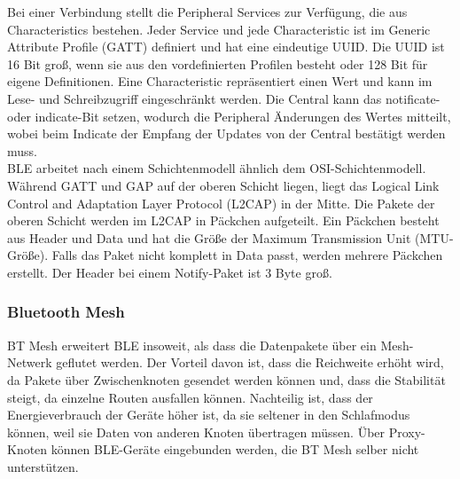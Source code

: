 Bei einer Verbindung stellt die Peripheral Services zur Verfügung, die aus Characteristics bestehen.
Jeder Service und jede Characteristic ist im Generic Attribute Profile (GATT) definiert und hat eine eindeutige UUID.
Die UUID ist 16 Bit groß, wenn sie aus den vordefinierten Profilen besteht oder 128 Bit für eigene Definitionen.
Eine Characteristic repräsentiert einen Wert und kann im Lese- und Schreibzugriff eingeschränkt werden.
Die Central kann das notificate- oder indicate-Bit setzen, wodurch die Peripheral Änderungen des Wertes mitteilt, wobei beim Indicate der Empfang der Updates von der Central bestätigt werden muss. \cite{site_norChara}\\
BLE arbeitet nach einem Schichtenmodell ähnlich dem OSI-Schichtenmodell.
Während GATT und GAP auf der oberen Schicht liegen, liegt das Logical Link Control and Adaptation Layer Protocol (L2CAP) in der Mitte.
Die Pakete der oberen Schicht werden im L2CAP in Päckchen aufgeteilt.
Ein Päckchen besteht aus Header und Data und hat die Größe der Maximum Transmission Unit (MTU-Größe).
Falls das Paket nicht komplett in Data passt, werden mehrere Päckchen erstellt.
Der Header bei einem Notify-Paket ist 3 Byte groß. \cite{site_til2cap}

\subsubsection{Bluetooth Mesh}
BT Mesh erweitert BLE insoweit, als dass die Datenpakete über ein Mesh-Netwerk geflutet werden.
Der Vorteil davon ist, dass die Reichweite erhöht wird, da Pakete über Zwischenknoten gesendet werden können und, dass die Stabilität steigt, da einzelne Routen ausfallen können.
Nachteilig ist, dass der Energieverbrauch der Geräte höher ist, da sie seltener in den Schlafmodus können, weil sie Daten von anderen Knoten übertragen müssen.
Über Proxy-Knoten können BLE-Geräte eingebunden werden, die BT Mesh selber nicht unterstützen. \cite{site_mesh}

